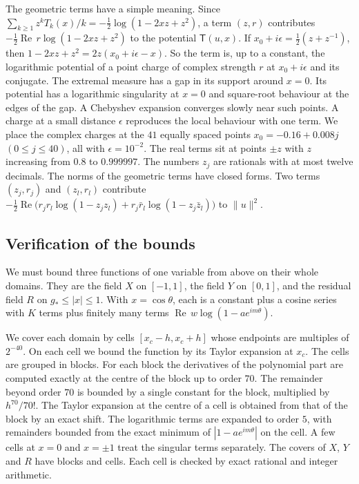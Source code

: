 The geometric terms have a simple meaning. Since $\sum_{k\ge1}z^kT_k(x)/k=-\frac12\log(1-2xz+z^2)$, a term
$(z,r)$ contributes $-\frac12\operatorname{Re}\,r\log(1-2xz+z^2)$ to the potential $\mathsf T(u,x)$. If
$x_0+i\epsilon=\frac12(z+z^{-1})$, then $1-2xz+z^2=2z(x_0+i\epsilon-x)$. So the term is, up to a constant, the
logarithmic potential of a point charge of complex strength $r$ at $x_0+i\epsilon$ and its conjugate. The
extremal measure has a gap in its support around $x=0$. Its potential has a logarithmic singularity at $x=0$
and square-root behaviour at the edges of the gap. A Chebyshev expansion converges slowly near such points.
A charge at a small distance $\epsilon$ reproduces the local behaviour with one term. We place the complex
charges at the $41$ equally spaced points $x_0=-0.16+0.008j$ $(0\le j\le40)$, all with $\epsilon=10^{-2}$.
The real terms sit at points $\pm z$ with $z$ increasing from $0.8$ to $0.999997$. The numbers $z_j$ are
rationals with at most twelve decimals. The norms of the geometric terms have closed forms. Two terms
$(z_j,r_j)$ and $(z_l,r_l)$ contribute
$-\frac12\operatorname{Re}\bigl(r_jr_l\log(1-z_jz_l)+r_j\bar r_l\log(1-z_j\bar z_l)\bigr)$ to $\|u\|^2$.

\subsection{Verification of the bounds}\label{ssec:cells}
We must bound three functions of one variable from above on their whole domains. They are the field $X$ on
$[-1,1]$, the field $Y$ on $[0,1]$, and the residual field $R$ on $g_*\le|x|\le1$. With $x=\cos\theta$, each is
a constant plus a cosine series with $K$ terms plus finitely many terms $\operatorname{Re}\,w\log(1-ae^{im\theta})$.

We cover each domain by cells $[x_c-h,x_c+h]$ whose endpoints are multiples of $2^{-40}$. On each cell we
bound the function by its Taylor expansion at $x_c$. The cells are grouped in blocks. For each block the
derivatives of the polynomial part are computed exactly at the centre of the block up to order $70$. The
remainder beyond order $70$ is bounded by a single constant for the block, multiplied by $h^{70}/70!$. The
Taylor expansion at the centre of a cell is obtained from that of the block by an exact shift. The
logarithmic terms are expanded to order $5$, with remainders bounded from the exact minimum of
$|1-ae^{im\theta}|$ on the cell. A few cells at $x=0$ and $x=\pm1$ treat the singular terms separately. The
covers of $X$, $Y$ and $R$ have \Nblocks{} blocks and \Ncells{} cells. Each cell is checked by exact rational and
integer arithmetic.

